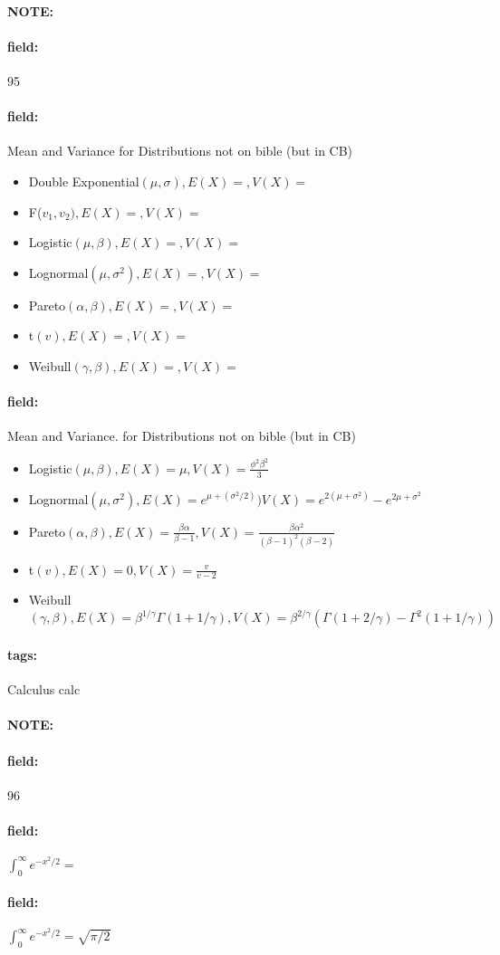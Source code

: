 \documentclass[12pt]{article}
\newenvironment{note}{\paragraph{NOTE:}}{}
\newenvironment{field}{\paragraph{field:}}{}
\newcommand*{\tags}[1]{\paragraph{tags: }#1}
\begin{document}
\begin{note} \begin{field} \tiny 95 \end{field}
  \begin{field}
    Mean and Variance for Distributions not on bible (but in CB)
      \begin{itemize}

        \item Double Exponential$(\mu,\sigma), E(X) = , V(X) = $
        \item F($v_1,v_2), E(X) = , V(X) = $
        \item Logistic$(\mu,\beta), E(X) = , V(X) = $
        \item Lognormal$(\mu,\sigma^2), E(X)=, V(X) = $
        \item Pareto$(\alpha,\beta), E(X) =, V(X) =$
        \item t$(v), E(X) = , V(X) = $
        \item Weibull$(\gamma,\beta), E(X) =, V(X) = $
      \end{itemize}
  \end{field}
  \begin{field}
    Mean and Variance. for Distributions not on bible (but in CB)
      \begin{itemize}

        \item Logistic$(\mu,\beta), E(X) = \mu, V(X) = \frac{\phi^2\beta^2}{3}$
        \item Lognormal$(\mu,\sigma^2), E(X)=e^{\mu + (\sigma^2/2)}) V(X) = e^{2(\mu+\sigma^2)} - e^{2\mu + \sigma^2}$
        \item Pareto$(\alpha,\beta), E(X) = \frac{\beta\alpha}{\beta-1}, V(X) = \frac{\beta\alpha^2}{(\beta-1)^2(\beta-2)}$
        \item t$(v), E(X) = 0, V(X) = \frac{v}{v-2}$
        \item Weibull$(\gamma,\beta), E(X) = \beta^{1/\gamma}\Gamma(1 + 1/\gamma), V(X) = \beta^{2/\gamma}(\Gamma(1 + 2/\gamma) - \Gamma^2(1 + 1/\gamma))$
      \end{itemize}
  \end{field}
\end{note}


\tags{Calculus calc}

\begin{note} \begin{field} \tiny 96 \end{field}
  \begin{field}
    $\int_0^\infty e^{-x^2/2} = $
  \end{field}
  \begin{field}
    $\int_0^\infty e^{-x^2/2} = \sqrt{\pi/2}$
  \end{field}
\end{note}
\end{document}

